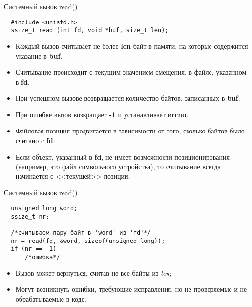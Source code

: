\documentclass[xcolor=table]{beamer}
\begin{document}
\begin{frame}[fragile]{Системный вызов read()}
\begin{verbatim}
  #include <unistd.h>
  ssize_t read (int fd, void *buf, size_t len);
 \end{verbatim}
 
	\linespread{0.9}
	\begin{itemize}
		\item Каждый вызов считывает не более \textbf{len} байт в памяти, на которые содержится	указание в \textbf{buf}. 
		\item Считывание происходит с текущим значением смещения, в файле, указанном в \textbf{fd}. 
		\item При успешном вызове возвращается количество байтов, записанных в \textbf{buf}. 
		\item При ошибке вызов возвращает \textbf{-1} и устанавливает \textbf{errno}. 
		\item Файловая позиция продвигается в зависимости от того, сколько байтов было считано с \textbf{fd}. 
		\item Если объект, указанный в \textbf{fd}, не имеет возможности позиционирования (например, это файл символьного устройства), то считывание всегда начинается с <<текущей>> позиции.
	\end{itemize}
	\linespread{1.0}
\end{frame}

\begin{frame}[fragile]{Системный вызов read()}
\begin{verbatim}
  unsigned long word;
  ssize_t nr;
  
  /*считываем пару байт в 'word' из 'fd'*/
  nr = read(fd, &word, sizeof(unsigned long));
  if (nr == -1)
      /*ошибка*/
\end{verbatim}

\begin{itemize}
\item Вызов может вернуться, считав не все байты из \textit{len}; 
\item Могут возникнуть ошибки, требующие исправления, но не проверяемые и не обрабатываемые в коде.
\end{itemize}
\end{frame}
\end{document}
